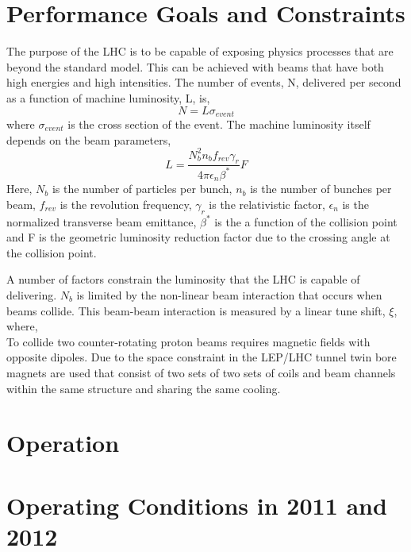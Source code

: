 \section{Performance Goals and Constraints}
The purpose of the LHC is to be
capable of exposing physics processes that are beyond the standard
model. This can be achieved with beams %
that have both high energies and high intensities.
The number of events, N, delivered per second as a function
of machine luminosity, L, is,
\begin{equation}
N=L\sigma_{event}
\end{equation}
where $\sigma_{event}$ is the cross section of the event.
The machine luminosity itself depends on the beam parameters,
\begin{equation}
L=\frac{N_{b}^{2}n_{b}f_{rev}\gamma_{r}}{4\pi \epsilon_{n}\beta^{*}}F
\end{equation}
Here, $N_{b}$ is the number of particles per bunch, $n_{b}$
is the number of bunches per beam, $f_{rev}$ is the
revolution frequency, $\gamma_{r}$ is the relativistic factor, 
$\epsilon_{n}$ is the normalized transverse beam
emittance, $\beta^{*}$ is the a function of the collision point
and F is the geometric luminosity reduction factor due to the crossing
angle at the collision point. 

A number of factors constrain the luminosity that the LHC is capable
of delivering. $N_{b}$ is limited by the
non-linear beam interaction that occurs when beams collide. This
beam-beam interaction is measured by a linear tune shift, $\xi$, where,
\begin{equation}
\end{equation}
To collide two counter-rotating proton beams requires magnetic fields
with opposite dipoles. Due to the space constraint in the LEP/LHC
tunnel twin bore magnets are used that consist of two sets of 
two sets of coils and beam channels within the same structure and
sharing the same cooling. 

\section{Operation}

\section{Operating Conditions in 2011 and 2012}

